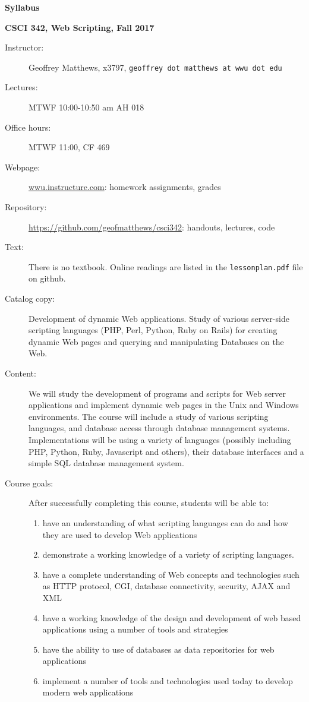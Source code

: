 \documentclass{article}
\begin{document}
\centerline{\large \bf Syllabus}

\centerline{\bf CSCI 342, Web Scripting, Fall 2017}

\begin{description}

\item[Instructor:] Geoffrey Matthews, x3797, {\tt geoffrey dot
  matthews at wwu dot edu}
\item[Lectures:] MTWF 10:00-10:50 am AH 018
\item[Office hours:] MTWF 11:00, CF 469
\item[Webpage:] \url{wwu.instructure.com}: homework assignments,
  grades
\item[Repository:] \url{https://github.com/geofmatthews/csci342}:
  handouts, lectures, code
\item[Text:] There is no textbook. Online readings are listed in the {\tt lessonplan.pdf} file on github.

\item[Catalog copy:] Development of dynamic Web applications. Study of
  various server-side scripting languages (PHP, Perl, Python, Ruby on
  Rails) for creating dynamic Web pages and querying and manipulating
  Databases on the Web.

\item[Content:] We will study the development of programs and scripts
for Web server applications and implement dynamic web pages in the
Unix and Windows environments.  The course will include a study of
various scripting languages, and database access through database
management systems.  Implementations will be using a variety of
languages (possibly including PHP, Python, Ruby, Javascript and
others), their database interfaces and a simple SQL database
management system.

\item[Course goals:] After successfully completing this course,
  students will be able to:
  \begin{enumerate}
  \item have an understanding of what scripting languages can do and
    how they are used to develop Web applications
  \item
    demonstrate a working knowledge of a variety of scripting
    languages.
  \item
    have a complete understanding of Web concepts and technologies
    such as HTTP protocol, CGI, database connectivity, security, AJAX
    and XML
  \item have a working knowledge of the design and development of web
    based applications using a number of tools and strategies
  \item have the ability to use of databases as data repositories for
    web applications
  \item implement a number of tools and technologies used today to
    develop modern web applications
  \end{enumerate}
  

\end{description}
\end{document}
